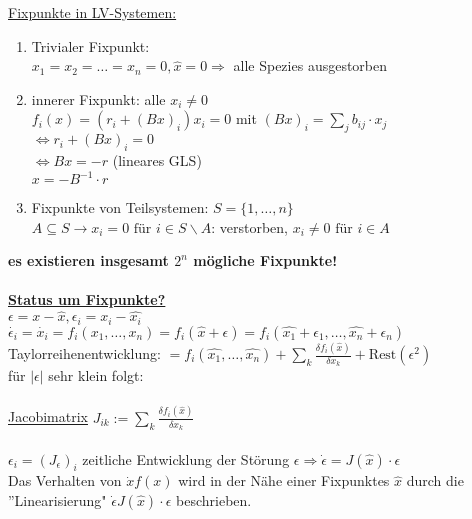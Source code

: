 \underline{Fixpunkte in LV-Systemen:}\\
\begin{enumerate}
	\item Trivialer Fixpunkt:\\
	$x_1=x_2=…=x_n=0, \hat{x}=0 \Rightarrow$ alle Spezies ausgestorben
	\item innerer Fixpunkt: alle $x_i\neq 0$\\
	$f_i(x)=(r_i + (Bx)_i)x_i=0$ mit $(Bx)_i=\sum_{j} b_{ij} \cdot x_j$\\
	$\Leftrightarrow r_i + (Bx)_i = 0$\\
	$\Leftrightarrow Bx=-r$ (lineares GLS)\\
	$x=-B^{-1} \cdot r$
	\item Fixpunkte von Teilsystemen: $S=\{1,…,n\}$\\
	$A \subseteq S \rightarrow x_i=0 \text{ für } i \in S\backslash A$: verstorben, $x_i \neq 0 \text{ für } i \in A$
\end{enumerate}

\textbf{es existieren insgesamt $2^n$ mögliche Fixpunkte!}\\\\

\underline{\textbf{Status um Fixpunkte?}}\\
$\epsilon=x-\hat{x}, \epsilon_i=x_i-\hat{x_i}$\\
$\dot{\epsilon_i}=\dot{x_i}=f_i(x_1,…,x_n)=f_i(\hat{x}+\epsilon)=f_i(\hat{x_1}+\epsilon_1, … , \hat{x_n}+\epsilon_n)$\\
Taylorreihenentwicklung: $=f_i(\hat{x_1}, … , \hat{x_n}) + \displaystyle  \sum_{k} \frac{\delta f_i(\hat{x})}{\delta x_k} + \text{Rest}(\epsilon^2)$\\
für $|\epsilon|$ sehr klein folgt:\\\\
\underline{Jacobimatrix} $J_{ik}:=\displaystyle \sum_{k} \frac{\delta f_i(\hat{x})}{\delta x_k}$\\\\
$\epsilon_i=(J_{\epsilon})_i$ zeitliche Entwicklung der Störung $\epsilon \Rightarrow \dot{\epsilon}=J(\hat{x}) \cdot \epsilon$\\

Das Verhalten von $\dot{x}f(x)$ wird in der Nähe einer Fixpunktes $\hat{x}$ durch die ''Linearisierung" $\dot{\epsilon}J(\hat{x}) \cdot \epsilon$ beschrieben.\\

